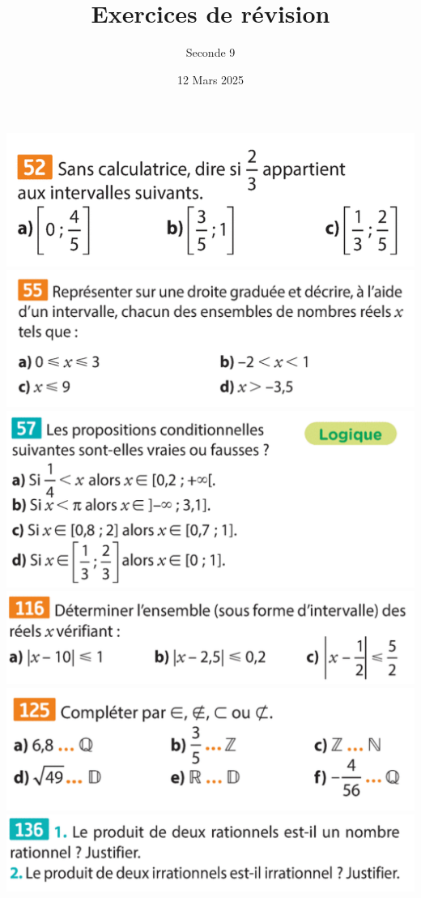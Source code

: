 \documentclass{article}
\title{Exercices de révision}
\author{Seconde 9}
\date{12 Mars 2025}
\begin{document}
\maketitle
\begin{center}
\includegraphics[width=\textwidth]{Exercice_1.png}
\includegraphics[width=\textwidth]{Exercice_2.png}
\includegraphics[width=\textwidth]{Exercice_3.png}
\includegraphics[width=\textwidth]{Exercice_4.png}
\includegraphics[width=\textwidth]{Exercice_5.png}
\includegraphics[width=\textwidth]{Exercice_6.png}
\vspace*{0.5cm}


\end{center}
\end{document}
